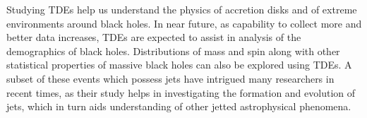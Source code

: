 \documentclass{tda}
\begin{document}
Studying TDEs help us understand the physics of accretion disks and of extreme environments around black holes. In near future, as capability to collect more and better data increases, TDEs are expected to assist in analysis of the demographics of black holes. Distributions of mass and spin along with other statistical properties of massive black holes can also be explored using TDEs. A subset of these events which possess jets have intrigued many researchers in recent times, as their study helps in investigating the formation and evolution of jets, which in turn aids understanding of other jetted astrophysical phenomena.

\clearpage
\printbibliography
\end{document}
